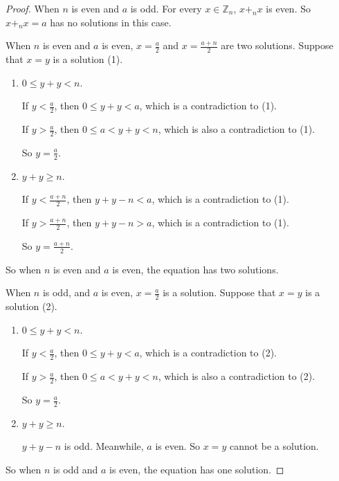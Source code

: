 \begin{proof}
    When $n$ is even and $a$ is odd. For every $x\in\mathbb{Z}_{n}$, $x {+}_{n} x$ is even. So $x {+}_{n} x = a$ has no solutions in this case.

    When $n$ is even and $a$ is even, $x = \frac{a}{2}$ and $x = \frac{a + n}{2}$ are two solutions. Suppose that $x = y$ is a solution (1).
    \begin{enumerate}[label={\textbf{Case \arabic*.}},itemindent=1cm]
        \item $0\le y + y < n$.

              If $y < \frac{a}{2}$, then $0\le y + y < a$, which is a contradiction to (1).

              If $y > \frac{a}{2}$, then $0\le a < y + y < n$, which is also a contradiction to (1).

              So $y = \frac{a}{2}$.
        \item $y + y \ge n$.

              If $y < \frac{a + n}{2}$, then $y + y - n < a$, which is a contradiction to (1).

              If $y > \frac{a + n}{2}$, then $y + y - n > a$, which is a contradiction to (1).

              So $y = \frac{a + n}{2}$.
    \end{enumerate}

    So when $n$ is even and $a$ is even, the equation has two solutions.

    When $n$ is odd, and $a$ is even, $x = \frac{a}{2}$ is a solution. Suppose that $x = y$ is a solution (2).
    \begin{enumerate}[label={\textbf{Case \arabic*}},itemindent=1cm]
        \item $0\le y + y < n$.

              If $y < \frac{a}{2}$, then $0\le y + y < a$, which is a contradiction to (2).

              If $y > \frac{a}{2}$, then $0\le a < y + y < n$, which is also a contradiction to (2).

              So $y = \frac{a}{2}$.
        \item $y + y\ge n$.

              $y + y - n$ is odd. Meanwhile, $a$ is even. So $x = y$ cannot be a solution.
    \end{enumerate}

    So when $n$ is odd and $a$ is even, the equation has one solution.


\end{proof}
